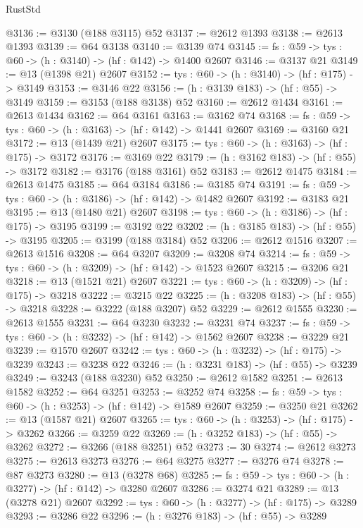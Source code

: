 \begin{lexlean}{RustStd}
\begin{coremodule}
@3136 := @3130 (@188 @3115) @52
@3137 := @2612 @1393
@3138 := @2613 @1393
@3139 := @64 @3138
@3140 := @3139 @74
@3145 := {fs : @59} -> {tys : @60} -> (h : @3140) -> (hf : @142) -> @1400 @2607
@3146 := @3137 @21
@3149 := @13 (@1398 @21) @2607
@3152 := {tys : @60} -> (h : @3140) -> (hf : @175) -> @3149
@3153 := @3146 @22
@3156 := (h : @3139 @183) -> (hf : @55) -> @3149
@3159 := @3153 (@188 @3138) @52
@3160 := @2612 @1434
@3161 := @2613 @1434
@3162 := @64 @3161
@3163 := @3162 @74
@3168 := {fs : @59} -> {tys : @60} -> (h : @3163) -> (hf : @142) -> @1441 @2607
@3169 := @3160 @21
@3172 := @13 (@1439 @21) @2607
@3175 := {tys : @60} -> (h : @3163) -> (hf : @175) -> @3172
@3176 := @3169 @22
@3179 := (h : @3162 @183) -> (hf : @55) -> @3172
@3182 := @3176 (@188 @3161) @52
@3183 := @2612 @1475
@3184 := @2613 @1475
@3185 := @64 @3184
@3186 := @3185 @74
@3191 := {fs : @59} -> {tys : @60} -> (h : @3186) -> (hf : @142) -> @1482 @2607
@3192 := @3183 @21
@3195 := @13 (@1480 @21) @2607
@3198 := {tys : @60} -> (h : @3186) -> (hf : @175) -> @3195
@3199 := @3192 @22
@3202 := (h : @3185 @183) -> (hf : @55) -> @3195
@3205 := @3199 (@188 @3184) @52
@3206 := @2612 @1516
@3207 := @2613 @1516
@3208 := @64 @3207
@3209 := @3208 @74
@3214 := {fs : @59} -> {tys : @60} -> (h : @3209) -> (hf : @142) -> @1523 @2607
@3215 := @3206 @21
@3218 := @13 (@1521 @21) @2607
@3221 := {tys : @60} -> (h : @3209) -> (hf : @175) -> @3218
@3222 := @3215 @22
@3225 := (h : @3208 @183) -> (hf : @55) -> @3218
@3228 := @3222 (@188 @3207) @52
@3229 := @2612 @1555
@3230 := @2613 @1555
@3231 := @64 @3230
@3232 := @3231 @74
@3237 := {fs : @59} -> {tys : @60} -> (h : @3232) -> (hf : @142) -> @1562 @2607
@3238 := @3229 @21
@3239 := @1570 @2607
@3242 := {tys : @60} -> (h : @3232) -> (hf : @175) -> @3239
@3243 := @3238 @22
@3246 := (h : @3231 @183) -> (hf : @55) -> @3239
@3249 := @3243 (@188 @3230) @52
@3250 := @2612 @1582
@3251 := @2613 @1582
@3252 := @64 @3251
@3253 := @3252 @74
@3258 := {fs : @59} -> {tys : @60} -> (h : @3253) -> (hf : @142) -> @1589 @2607
@3259 := @3250 @21
@3262 := @13 (@1587 @21) @2607
@3265 := {tys : @60} -> (h : @3253) -> (hf : @175) -> @3262
@3266 := @3259 @22
@3269 := (h : @3252 @183) -> (hf : @55) -> @3262
@3272 := @3266 (@188 @3251) @52
@3273 := 30
@3274 := @2612 @3273
@3275 := @2613 @3273
@3276 := @64 @3275
@3277 := @3276 @74
@3278 := @87 @3273
@3280 := @13 (@3278 @68)
@3285 := {fs : @59} -> {tys : @60} -> (h : @3277) -> (hf : @142) -> @3280 @2607
@3286 := @3274 @21
@3289 := @13 (@3278 @21) @2607
@3292 := {tys : @60} -> (h : @3277) -> (hf : @175) -> @3289
@3293 := @3286 @22
@3296 := (h : @3276 @183) -> (hf : @55) -> @3289

\end{coremodule}
\end{lexlean}
